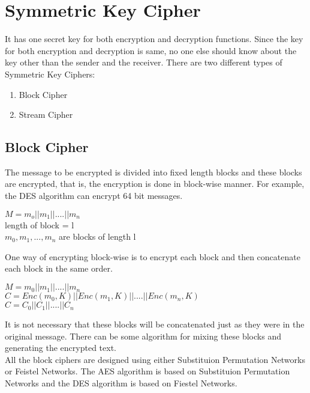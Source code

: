 \documentclass[11pt]{article}
\begin{document}
\section{Symmetric Key Cipher}
It has one secret key for both encryption and decryption functions. Since the key for both encryption and decryption is same, no one else should know about the key other than the sender and the receiver. There are two different types of Symmetric Key Ciphers:
\begin{enumerate}
    \item Block Cipher
    \item Stream Cipher
\end{enumerate}

\subsection{Block Cipher}
The message to be encrypted is divided into fixed length blocks and these blocks are encrypted, that is, the encryption is done in block-wise manner. For example, the DES algorithm can encrypt 64 bit messages.
\begin{center}
    $M = m_o||m_1||....||m_n$\\
    length of block = l\\
    $m_0, m_1, ..., m_n$ are blocks of length l
\end{center}
One way of encrypting block-wise is to encrypt each block and then concatenate each block in the same order.
\begin{center}
    $M = m_0 || m_1 || .... || m_n$ \\
    $C = Enc(m_0, K) || Enc(m_1, K) || .... || Enc(m_n, K)$ \\
    $C = C_0 || C_1 || .... || C_n$
\end{center}
It is not necessary that these blocks will be concatenated just as they were in the original message. There can be some algorithm for mixing these blocks and generating the encrypted text.\\
\newline
All the block ciphers are designed using either Substituion Permutation Networks or Feistel Networks. The AES algorithm is based on Substituion Permutation Networks and the DES algorithm is based on Fiestel Networks.
\end{document}
